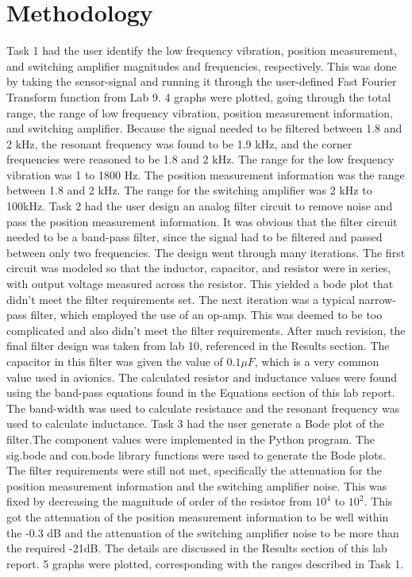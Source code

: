 \documentclass[12pt]{article}
\begin{document}
\section{Methodology}
Task 1 had the user identify the low frequency vibration, position measurement, and switching amplifier magnitudes and frequencies, respectively. This was done by taking the sensor-signal and running it through the user-defined Fast Fourier Transform function from Lab 9. 4 graphs were plotted, going through the total range, the range of low frequency vibration, position measurement information, and switching amplifier. Because the signal needed to be filtered between 1.8 and 2 kHz, the resonant frequency was found to be 1.9 kHz, and the corner frequencies were reasoned to be 1.8 and 2 kHz. The range for the low frequency vibration was 1 to 1800 Hz. The position measurement information was the range between 1.8 and 2 kHz. The range for the switching amplifier was 2 kHz to 100kHz.
\newline \newline
Task 2 had the user design an analog filter circuit to remove noise and pass the position measurement information. It was obvious that the filter circuit needed to be a band-pass filter, since the signal had to be filtered and passed between only two frequencies. The design went through many iterations. The first circuit was modeled so that the inductor, capacitor, and resistor were in series, with output voltage measured across the resistor. This yielded a bode plot that didn't meet the filter requirements set. The next iteration was a typical narrow-pass filter, which employed the use of an op-amp. This was deemed to be too complicated and also didn't meet the filter requirements. After much revision, the final filter design was taken from lab 10, referenced in the Results section.\newline \newline
The capacitor in this filter was given the value of $0.1 \mu F$, which is a very common value used in avionics. The calculated resistor and inductance values were found using the band-pass equations found in the Equations section of this lab report. The band-width was used to calculate resistance and the resonant frequency was used to calculate inductance.\newline \newline
Task 3 had the user generate a Bode plot of the filter.The component values were implemented in the Python program. The sig.bode and con.bode library functions were used to generate the Bode plots. The filter requirements were still not met, specifically the attenuation for the position measurement information and the switching amplifier noise. This was fixed by decreasing the magnitude of order of the resistor from $10^4$ to $10^2$. This got the attenuation of the position measurement information to be well within the -0.3 dB and the attenuation of the switching amplifier noise to be more than the required -21dB. The details are discussed in the Results section of this lab report. 5 graphs were plotted, corresponding with the ranges described in Task 1.\newline \newline
\end{document}

